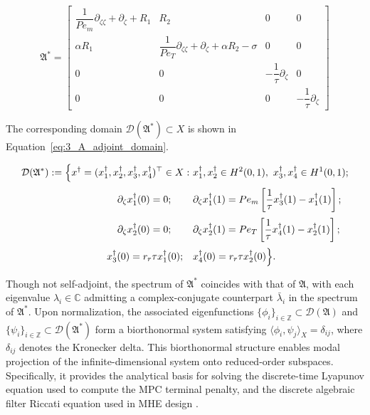 \begin{equation} \label{eq:3_A_adjoint}
\mathfrak{A}^* =
\begin{bmatrix} 
\dfrac{1}{Pe_m} \partial_{\zeta \zeta} + \partial_\zeta + R_1 & R_2 & 0 & 0 \\
\alpha R_1 & \dfrac{1}{Pe_T} \partial_{\zeta \zeta} + \partial_\zeta + \alpha R_2 - \sigma & 0 & 0 \\
0 & 0 & -\dfrac{1}{\tau} \partial_\zeta & 0 \\
0 & 0 & 0 & -\dfrac{1}{\tau} \partial_\zeta
\end{bmatrix}
\end{equation}

The corresponding domain $\mathcal{D}(\mathfrak{A}^*) \subset X$ is shown in Equation~\eqref{eq:3_A_adjoint_domain}.

\begin{equation} \label{eq:3_A_adjoint_domain}
\begin{aligned}
\mathcal{D}(\mathfrak{A}^*) := \Big\{ x^\dagger = (x_1^\dagger, x_2^\dagger, x_3^\dagger, x_4^\dagger)^\top \in X :\ 
& x_1^\dagger, x_2^\dagger \in H^2(0,1),\ x_3^\dagger, x_4^\dagger \in H^1(0,1); \\[0.5ex]
\partial_\zeta x_1^\dagger(0) = 0; \hspace{2.2em} & \partial_\zeta x_1^\dagger(1) = Pe_m \left[ \frac{1}{\tau} x_3^\dagger(1) - x_1^\dagger(1) \right]; \\[0.5ex]
\partial_\zeta x_2^\dagger(0) = 0; \hspace{2.2em} & \partial_\zeta x_2^\dagger(1) = Pe_T \left[ \frac{1}{\tau} x_4^\dagger(1) - x_2^\dagger(1) \right]; \\[0.5ex]
x_3^\dagger(0) = r_r \tau x_1^\dagger(0); \quad & x_4^\dagger(0) = r_r \tau x_2^\dagger(0)
\Big\}.
\end{aligned}
\end{equation}


Though not self-adjoint, the spectrum of $\mathfrak{A}^*$ coincides with that of $\mathfrak{A}$, with each eigenvalue $\lambda_i \in \mathbb{C}$ admitting a complex-conjugate counterpart $\bar{\lambda}_i$ in the spectrum of $\mathfrak{A}^* $. Upon normalization, the associated eigenfunctions $\{ \phi_i \}_{i \in \mathbb{Z}} \subset \mathcal{D}(\mathfrak{A})$ and $\{ \psi_i \}_{i \in \mathbb{Z}} \subset \mathcal{D}(\mathfrak{A}^*)$ form a biorthonormal system satisfying $\langle \phi_i, \psi_j \rangle_X = \delta_{ij}$, where $\delta_{ij}$ denotes the Kronecker delta. This biorthonormal structure enables modal projection of the infinite-dimensional system onto reduced-order subspaces. Specifically, it provides the analytical basis for solving the discrete-time Lyapunov equation used to compute the MPC terminal penalty, and the discrete algebraic filter Riccati equation used in MHE design \autocite{Moadeli2025Optimal, Khatibi2021Model, xie2022constrained}.

